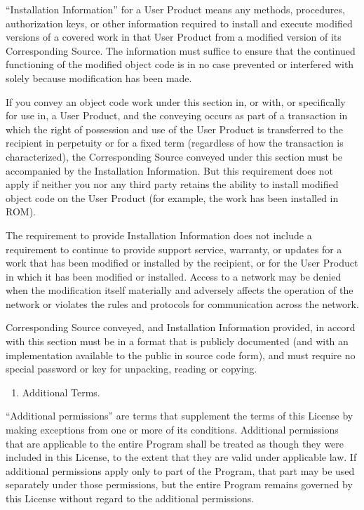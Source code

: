 \documentclass[11pt]{article}
\begin{document}
“Installation Information” for a User Product means any methods, procedures, authorization keys, or other information required to install and execute modified versions of a covered work in that User Product from a modified version of its Corresponding Source. The information must suffice to ensure that the continued functioning of the modified object code is in no case prevented or interfered with solely because modification has been made.

If you convey an object code work under this section in, or with, or specifically for use in, a User Product, and the conveying occurs as part of a transaction in which the right of possession and use of the User Product is transferred to the recipient in perpetuity or for a fixed term (regardless of how the transaction is characterized), the Corresponding Source conveyed under this section must be accompanied by the Installation Information. But this requirement does not apply if neither you nor any third party retains the ability to install modified object code on the User Product (for example, the work has been installed in ROM).

The requirement to provide Installation Information does not include a requirement to continue to provide support service, warranty, or updates for a work that has been modified or installed by the recipient, or for the User Product in which it has been modified or installed. Access to a network may be denied when the modification itself materially and adversely affects the operation of the network or violates the rules and protocols for communication across the network.

Corresponding Source conveyed, and Installation Information provided, in accord with this section must be in a format that is publicly documented (and with an implementation available to the public in source code form), and must require no special password or key for unpacking, reading or copying.

\begin{enumerate}
\item Additional Terms.
\end{enumerate}
“Additional permissions” are terms that supplement the terms of this License by making exceptions from one or more of its conditions. Additional permissions that are applicable to the entire Program shall be treated as though they were included in this License, to the extent that they are valid under applicable law. If additional permissions apply only to part of the Program, that part may be used separately under those permissions, but the entire Program remains governed by this License without regard to the additional permissions.
\end{document}

